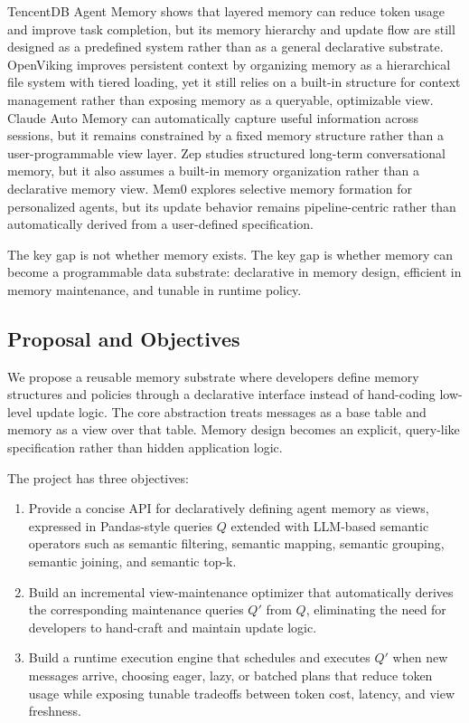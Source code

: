 \documentclass[11pt]{article}
\newcommand{\Q}{Q}
\newcommand{\DQ}{Q'}
\begin{document}
TencentDB Agent Memory shows that layered memory can reduce token usage and
improve task completion, but its memory hierarchy and update flow are still
designed as a predefined system rather than as a general declarative substrate.
OpenViking improves persistent context by organizing memory as a hierarchical
file system with tiered loading, yet it still relies on a built-in structure for
context management rather than exposing memory as a queryable, optimizable
view. Claude Auto Memory can automatically capture useful information across
sessions, but it remains constrained by a fixed memory structure rather than a
user-programmable view layer. Zep studies structured long-term conversational
memory, but it also assumes a built-in memory organization rather than a
declarative memory view. Mem0 explores selective memory formation for
personalized agents, but its update behavior remains pipeline-centric rather
than automatically derived from a user-defined specification.

The key gap is not whether memory exists. The key gap is whether memory can
become a programmable data substrate: declarative in memory design, efficient
in memory maintenance, and tunable in runtime policy.

\subsection{Proposal and Objectives}

We propose a reusable memory substrate where developers define memory
structures and policies through a declarative interface instead of hand-coding
low-level update logic. The core abstraction treats messages as a base table
and memory as a view over that table. Memory design becomes an explicit,
query-like specification rather than hidden application logic.

The project has three objectives:

\begin{enumerate}[leftmargin=*]
  \item Provide a concise API for declaratively defining agent memory as views,
  expressed in Pandas-style queries \(\Q\) extended with LLM-based semantic
  operators such as semantic filtering, semantic mapping, semantic grouping,
  semantic joining, and semantic top-k.

  \item Build an incremental view-maintenance optimizer that automatically
  derives the corresponding maintenance queries \(\DQ\) from \(\Q\),
  eliminating the need for developers to hand-craft and maintain update logic.

  \item Build a runtime execution engine that schedules and executes \(\DQ\)
  when new messages arrive, choosing eager, lazy, or batched plans that reduce
  token usage while exposing tunable tradeoffs between token cost, latency, and
  view freshness.
\end{enumerate}
\end{document}
